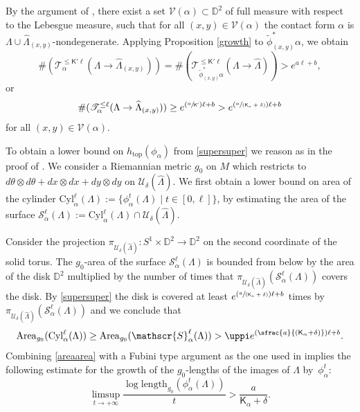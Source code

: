 \documentclass[JEP,XML,SOM,Unicode,NoFloatCountersInSection]{cedram}
\let\mathcal\mathscr
\let\ra\rightarrow
\newcommand{\length}{\mathrm{length}}
\renewcommand{\top}{\mathrm{top}}
\newcommand{\Pspfrac}[2]{(\sfrac{#1}{(#2)})}
\newcommand{\Psfrac}[2]{(\sfrac{#1}{#2})}
\theoremstyle{plain}
\theoremstyle{definition}
\numberwithin{equation}{subsection}
\begin{document}
By the argument of \cite[Lem.\,3]{Al}, there exist a set $\mathcal{V}(\alpha) \subset \mathbb{D}^2$ of full measure with respect to the Lebesgue measure, such that for all $(x,y) \in \mathcal{V}(\alpha)$ the contact form $\alpha$ is $\Lambda\cup\widehat{\Lambda}_{(x,y)}$-nondegenerate. Applying Proposition \ref{growth} to $\widetilde{\phi}_{(x,y)}^* \alpha$, we obtain
\begin{equation}
\#(\mathcal{T}^{\leq \mathsf{K}' \ell}_\alpha(\Lambda\ra \widehat{\Lambda}_{(x,y)})) = \#(\mathcal{T}^{\leq\mathsf{K}' \ell}_ {\widetilde{\phi}_{(x,y)}^*\alpha}(\Lambda\ra \widehat{\Lambda})) >e^{a\ell +b},
\end{equation}
or
\begin{equation} \label{supersuper}
\#(\mathcal{T}^{\leq \ell}_\alpha(\Lambda\ra \widehat{\Lambda}_{(x,y)})) \geq e^{\Psfrac{a}{\mathsf{K}'} \ell +b}> e^{\Pspfrac{a}{\mathsf{K}_{ \alpha} + \delta} \ell +b}
\end{equation}
for all $(x,y) \in \mathcal{V}(\alpha)$.

To obtain a lower bound on $h_{\top}(\phi_\alpha) $ from \eqref{supersuper} we reason as in the proof of \cite[Th.\,1]{Al}. We consider a Riemannian metric $g_0$ on $M$ which restricts to \hbox{$d\theta \otimes d\theta + dx \otimes dx + dy \otimes dy$} on $\mathcal{U}_\delta(\widehat{\Lambda})$. We first obtain a lower bound on area of the cylinder $\mathrm{Cyl}_\alpha^\ell(\Lambda):=\{\phi^t_\alpha(\Lambda) \mid t \in [0,\ell]\}$, by estimating the area of the surface $ \mathcal{S}_\alpha^\ell(\Lambda) :=\mathrm{Cyl}_\alpha^\ell(\Lambda) \cap \mathcal{U}_\delta(\widehat{\Lambda})$.

Consider the projection $\pi_{\mathcal{U}_\delta(\widehat{\Lambda})}: S^1 \times \mathbb{D}^2 \to \mathbb{D}^2$ on the second coordinate of the solid torus.
The $g_0$-area of the surface $\mathcal{S}_\alpha^\ell(\Lambda)$ is bounded from below by the area of the disk $\mathbb{D}^2$ multiplied by the number of times that $\pi_{\mathcal{U}_\delta(\widehat{\Lambda})}(\mathcal{S}_\alpha^\ell(\Lambda))$ covers the disk. By \eqref{supersuper} the disk is covered at least $e^{\Pspfrac{a}{\mathsf{K}_{ \alpha} + \delta} \ell +b}$ times by $\pi_{\mathcal{U}_\delta(\widehat{\Lambda})}(\mathcal{S}_\alpha^\ell(\Lambda))$ and we conclude that
\begin{equation} \label{areaarea}
\mathrm{Area}_{g_0}(\mathrm{Cyl}_\alpha^\ell(\Lambda)) \geq \mathrm{Area}_{g_0}(\mathcal{S}_\alpha^\ell(\Lambda)) > \uppi e^{\Pspfrac{a}{\mathsf{K}_{ \alpha} + \delta} \ell +b}.
\end{equation}
Combining \eqref{areaarea} with a Fubini type argument as the one used in \cite[Th.\,1]{Al} implies the following estimate for the growth of the $g_0$-lengths of the images of $\Lambda$ by~$\phi^t_\alpha$:
\begin{equation}%
\limsup_{t\to +\infty }\frac{\log\length_{g_0}(\phi^t_\alpha(\Lambda))}{t} > \frac{a}{\mathsf{K}_\alpha + \delta}.
\end{equation}
\end{document}
